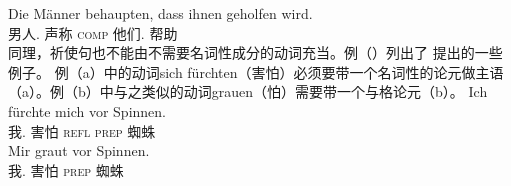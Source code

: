 \ea
\gll Die Männer behaupten, dass ihnen geholfen wird.\\
	  男人.\nom{} 声称 \textsc{comp} 他们.\dat{} 帮助 \passiveprs\\
\z
%
同理，祈使句也不能由不需要名词性成分的动词充当。例（）列出了 \citet[]{Reis82}提出的一些例子。
\eal
{}
\zl
例（a）中的动词sich fürchten（害怕）必须要带一个名词性的论元做主语（a）。例（b）中与之类似的动词grauen（怕）需要带一个与格论元（b）。
\eal
\ex
\gll Ich fürchte mich vor Spinnen.\\
	 我.\nom{} 害怕 \textsc{refl} \textsc{prep} 蜘蛛\\
\ex 
\gll Mir graut vor Spinnen.\\
	 我.\dat{} 害怕 \textsc{prep} 蜘蛛\\
\zl

